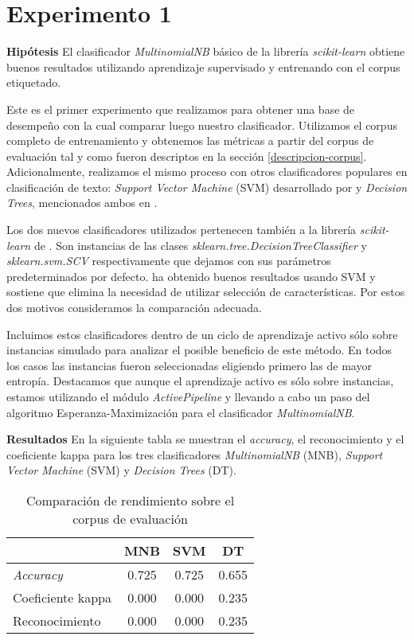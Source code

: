 \section{Experimento 1}
\vspace{3 mm}
\textbf{Hipótesis} El clasificador \textit{MultinomialNB} básico de la librería \textit{scikit-learn} obtiene buenos resultados utilizando aprendizaje supervisado y entrenando con el corpus etiquetado.
\vspace{3 mm}

Este es el primer experimento que realizamos para obtener una base de desempeño con la cual comparar luego nuestro clasificador. Utilizamos el corpus completo de entrenamiento y obtenemos las métricas a partir del corpus de evaluación tal y como fueron descriptos en la sección \ref{descripcion-corpus}.
Adicionalmente, realizamos el mismo proceso con otros clasificadores populares en clasificación de texto: \textit{Support Vector Machine} (SVM) desarrollado por \citet{svm-cortes} y \textit{Decision Trees}, mencionados ambos en \citet{Sebastiani-text-categorization}.

Los dos nuevos clasificadores utilizados pertenecen también a la librería \textit{scikit-learn} de \citet{scikit-learn}. Son instancias de las clases \textit{sklearn.tree.DecisionTreeClassifier} y \textit{sklearn.svm.SCV} respectivamente que dejamos con sus parámetros predeterminados por defecto. \citet{svm-uso-Joachims} ha obtenido buenos resultados usando SVM y sostiene que elimina la necesidad de utilizar selección de características. Por estos dos motivos consideramos la comparación adecuada.

Incluimos estos clasificadores dentro de un ciclo de aprendizaje activo sólo sobre instancias simulado para analizar el posible beneficio de este método. En todos los casos las instancias fueron seleccionadas eligiendo primero las de mayor entropía. Destacamos que aunque el aprendizaje activo es sólo sobre instancias, estamos utilizando el módulo \textit{ActivePipeline} y llevando a cabo un paso del algoritmo Esperanza-Maximización para el clasificador \textit{MultinomialNB}.

\vspace{3 mm}

\textbf{Resultados} En la siguiente tabla se muestran el \textit{accuracy}, el reconocimiento y el coeficiente kappa para los tres clasificadores \textit{MultinomialNB} (MNB), \textit{Support Vector Machine} (SVM) y \textit{Decision Trees} (DT).

\begin{table}[h]
\centering
\begin{tabular}{l c c c}
     & MNB & SVM & DT\\ [0.5ex]
    \hline
    \textit{Accuracy} & 0.725 & 0.725 & 0.655 \\ [0.5ex]
    Coeficiente kappa & 0.000 & 0.000 & 0.235 \\ [0.5ex]
    Reconocimiento & 0.000 & 0.000 & 0.235 \\[1ex]
    \hline
\end{tabular}
\caption{Comparación de rendimiento sobre el corpus de evaluación}
\end{table}

